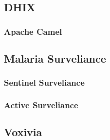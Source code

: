 \subsection{DHIX}
\subsubsection{Apache Camel}
\subsection{Malaria Surveliance}
\subsubsection{Sentinel Surveliance}
\subsubsection{Active Surveliance}
\subsection{Voxivia}

